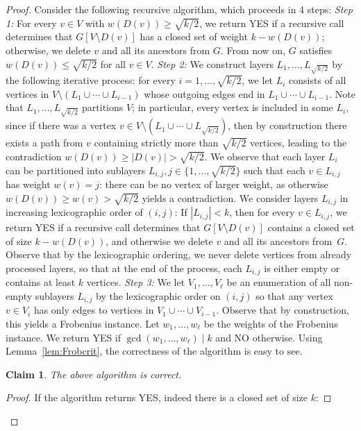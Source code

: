 \documentclass[10pt,a4paper]{article}
\theoremstyle{plain}
\newtheorem{claim}[thm]{Claim}
\newcommand{\divides}{\mid}
\begin{document}
\begin{proof}
Consider the following recursive algorithm, which proceeds in 4 steps:
%
\emph{Step 1:} For every $v\in V$ with $w(D(v)) \ge \sqrt{k/2}$, we return YES if a recursive call determines that $G[V \setminus D(v)]$ has a closed set of weight $k-w(D(v))$; otherwise, we delete $v$ and all its ancestors from $G$. From now on, $G$ satisfies $w(D(v)) \le \sqrt{k/2}$ for all $v\in V$.
%
\emph{Step 2:} We construct layers $L_1, \dots, L_{\sqrt{k/2}}$ by the following iterative process: for every $i=1, \dots, \sqrt{k/2}$, we let $L_i$ consists of all vertices in $V\setminus (L_1 \cup \cdots \cup L_{i-1})$ whose outgoing edges end in $L_1\cup \cdots \cup L_{i-1}$. Note that $L_1, \dots, L_{\sqrt{k/2}}$ partitions $V$; in particular, every vertex is included in some $L_i$, since if there was a vertex $v\in V\setminus (L_1 \cup \cdots \cup L_{\sqrt{k/2}})$, then by construction there exists a path from $v$ containing strictly more than $\sqrt{k/2}$ vertices, leading to the contradiction $w(D(v))\ge |D(v)| > \sqrt{k/2}$. 
%
We observe that each layer $L_i$ can be partitioned into sublayers $L_{i,j}, j\in \{1, \dots, \sqrt{k/2}\}$ such that each $v\in L_{i,j}$ has weight $w(v) = j$: there can be no vertex of larger weight, as otherwise $w(D(v)) \ge w(v) > \sqrt{k/2}$ yields a contradiction. We consider layers $L_{i,j}$ in increasing lexicographic order of $(i,j)$: If $|L_{i,j}| < k$, then for every $v\in L_{i,j}$, we return YES if a recursive call determines that $G[V\setminus D(v)]$ contains a closed set of size $k-w(D(v))$, and otherwise we delete $v$ and all its ancestors from~$G$. Observe that by the lexicographic ordering, we never delete vertices from already processed layers, so that at the end of the process, each $L_{i,j}$ is either empty or contains at least $k$ vertices. 
%
\emph{Step 3:} We let $V_1, \dots, V_\ell$ be an enumeration of all non-empty sublayers $L_{i,j}$ by the lexicographic order on $(i,j)$ so that any vertex $v\in V_{i}$ has only edges to vertices in $V_1 \cup \cdots \cup V_{i-1}$. Observe that by construction, this yields a Frobenius instance. Let $w_1,\dots, w_\ell$ be the weights of the Frobenius instance. We return YES if $\gcd(w_1,\dots, w_\ell) \divides k$ and NO otherwise. 
%
Using Lemma~\ref{lem:Frobcrit}, the correctness of the algorithm is easy to see.
%
\begin{claim}\label{cl:imp1}
The above algorithm is correct.
\end{claim}
\begin{proof}
If the algorithm returns YES, indeed there is a closed set of size $k$: 

\end{proof}
\end{proof}
\end{document}
